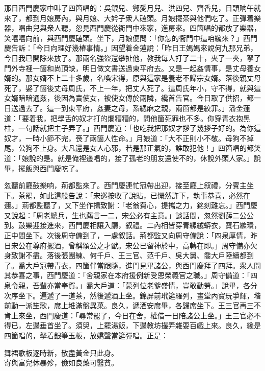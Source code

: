 那日西門慶家中叫了四箇唱的：吳銀兒、鄭愛月兒、洪四兒、齊香兒，日頭晌午就來了，都到月娘房內，與月娘、大妗子衆人磕頭。月娘擺茶與他們吃了。正彈着樂器，唱曲兒與衆人聽，忽見西門慶從衙門中來家，進房來。四箇唱的都放了樂器，笑嘻嘻向前，與西門慶磕頭。坐下，月娘便問：「你怎的衙門中這咱纔來？」西門慶告訴：「今日向理好幾樁事情。」因望着金蓮說：「昨日王媽媽來說何九那兄弟，今日我已開除來放了。那兩名強盜還攀扯他，教我每人打了二十，夾了一夾，拏了門外寺裡一箇和尚頂缺，明日做文書送過東平府去。又是一起姦情事，是丈母養女婿的。那女婿不上二十多歲，名喚宋得，原與這家是養老不歸宗女婿。落後親丈母死了，娶了箇後丈母周氏，不上一年，把丈人死了。這周氏年小，守不得，就與這女婿暗暗通姦，後因為責使女，被使女傳於兩隣，纔首告官。今日取了供招，都一日送過去了。這一到東平府，姦妻之母，系緦麻之親，兩箇都是絞罪。」潘金蓮道：「要着我，把學舌的奴才打的爛糟糟的，問他箇死罪也不多。你穿青衣抱黑柱，一句話就把主子弄了。」{}{}西門慶道：「也吃我把那奴才拶了幾拶子好的。為你這奴才，一時小節不完，䘮了兩箇人性命。」月娘道：「大不正則小不敬。母狗不掉尾，公狗不上身。大凡還是女人心邪，若是那正氣的，誰敢犯他！」{}四箇唱的都笑道：「娘說的是。就是俺裡邊唱的，接了孤老的朋友還使不的，休說外頭人家。」說畢，擺飯與西門慶吃了。

忽聽前廳鼓樂响，荊都監來了。西門慶連忙冠帶出迎，接至廳上叙禮，分賓主坐下。茶罷，如此這般告說：「宋巡按收了說貼，已慨然許下，執事恭喜，必然在邇。」荊都監聽了，又下坐作揖致謝：「老翁費心，提攜之力，銘刻難忘。」西門慶又說起：「周老總兵，生也薦言一二，宋公必有主意。」談話間，忽然劉薛二公公到。鼓樂迎接進來，西門慶相讓入廳，叙禮。二內相皆穿青縲絨蟒衣，寶石縧環，正中間坐下。次後周守備到了，一處叙話。荊都監又向周守備說：「四泉厚情，昨日宋公在尊府擺酒，曾稱頌公之才猷。宋公已留神於中，高轉在即。」周守備亦欠身致謝不盡。落後張團練、何千戶、王三官、范千戶、吳大舅、喬大戶陸續都到了。喬大戶冠帶青衣，四箇伴當跟隨，{}進門見畢諸公，與西門慶拜了四拜。衆人問其恭喜之事，西門慶道：「舍親家在本府援例新受恩榮義官之職。」周守備道：「四泉令親，吾輩亦當奉賀。」喬大戶道：「蒙列位老爹盛情，{}豈敢動勞。」說畢，各分次序坐下。遍遞了一道茶，然後遞酒上坐。錦屏前玳筵羅列，畫堂內寶玩爭輝，堦前動一派笙歌，席上堆滿盤異菓。良久，遞酒安席畢，各歸席坐下。王三官再三不肯上來坐，西門慶道：「尋常罷了，今日在舍，權借一日陪諸公上坐。」王三官必不得已，左邊垂首坐了。須臾，上罷湯飯，下邊教坊撮弄雜耍百戲上來。良久，纔是四箇唱的，拏着銀箏玉板，放嬌聲當筵彈唱。正是：

\begin{myquote} 
舞裙歌板逐時新，散盡黃金只此身。\\寄與富兒休暴殄，儉如良藥可醫貧。
\end{myquote} 


